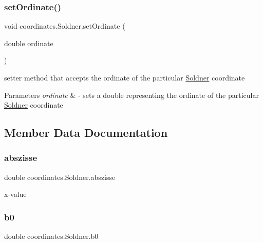\subsubsection{\texorpdfstring{set\+Ordinate()}{setOrdinate()}}
{\footnotesize\ttfamily void coordinates.\+Soldner.\+set\+Ordinate (\begin{DoxyParamCaption}\item[{double}]{ordinate }\end{DoxyParamCaption})}



setter method that accepts the ordinate of the particular \hyperlink{classcoordinates_1_1_soldner}{Soldner} coordinate 


\begin{DoxyParams}{Parameters}
{\em ordinate} & -\/ sets a double representing the ordinate of the particular \hyperlink{classcoordinates_1_1_soldner}{Soldner} coordinate \\
\hline
\end{DoxyParams}


\subsection{Member Data Documentation}
\mbox{\label{classcoordinates_1_1_soldner_ab1bec5d8a11e84c0cdc3154fd1abf843}} 
\subsubsection{\texorpdfstring{abszisse}{abszisse}}
{\footnotesize\ttfamily double coordinates.\+Soldner.\+abszisse\hspace{0.3cm}{\ttfamily [private]}}

x-\/value \mbox{\label{classcoordinates_1_1_soldner_a489fa7e9e4c0c09e502bbbf2fb7ad689}} 
\subsubsection{\texorpdfstring{b0}{b0}}
{\footnotesize\ttfamily double coordinates.\+Soldner.\+b0\hspace{0.3cm}{\ttfamily [private]}}

